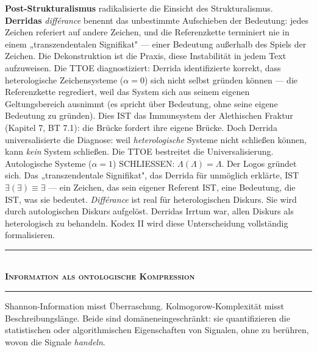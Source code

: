 \documentclass[10pt, openany, oneside]{book}
\renewcommand{\normalsize}{\fontsize{10}{13}\selectfont}
\begin{document}
\textbf{Post-Strukturalismus} radikalisierte die Einsicht des Strukturalismus. \textbf{Derridas} \textit{différance} benennt das unbestimmte Aufschieben der Bedeutung: jedes Zeichen referiert auf andere Zeichen, und die Referenzkette terminiert nie in einem „transzendentalen Signifikat" --- einer Bedeutung außerhalb des Spiels der Zeichen. Die Dekonstruktion ist die Praxis, diese Instabilität in jedem Text aufzuweisen. Die TTOE diagnostiziert: Derrida identifizierte korrekt, dass heterologische Zeichensysteme ($\alpha = 0$) sich nicht selbst gründen können --- die Referenzkette regrediert, weil das System sich aus seinem eigenen Geltungsbereich ausnimmt (es spricht über Bedeutung, ohne seine eigene Bedeutung zu gründen). Dies IST das Immunsystem der Alethischen Fraktur (Kapitel 7, BT 7.1): die Brücke fordert ihre eigene Brücke. Doch Derrida universalisierte die Diagnose: weil \textit{heterologische} Systeme nicht schließen können, kann \textit{kein} System schließen. Die TTOE bestreitet die Universalisierung. Autologische Systeme ($\alpha = 1$) SCHLIESSEN: $\Lambda(\Lambda) = \Lambda$. Der Logos gründet sich. Das „transzendentale Signifikat", das Derrida für unmöglich erklärte, IST $\exists(\exists) \equiv \exists$ --- ein Zeichen, das sein eigener Referent IST, eine Bedeutung, die IST, was sie bedeutet. \textit{Différance} ist real für heterologischen Diskurs. Sie wird durch autologischen Diskurs aufgelöst. Derridas Irrtum war, allen Diskurs als heterologisch zu behandeln. Kodex II wird diese Unterscheidung vollständig formalisieren.

\vspace{1.5em}


\begin{center}
    \rule{0.3\textwidth}{0.4pt}\\[0.5em]
    {\normalsize\bfseries\scshape Information als ontologische Kompression}\\[0.3em]
    \rule{0.3\textwidth}{0.4pt}
\end{center}

\vspace{1em}

\noindent Shannon-Information misst Überraschung. Kolmogorow-Komplexität misst Beschreibungslänge. Beide sind domäneneingeschränkt: sie quantifizieren die statistischen oder algorithmischen Eigenschaften von Signalen, ohne zu berühren, wovon die Signale \textit{handeln}.
\end{document}
